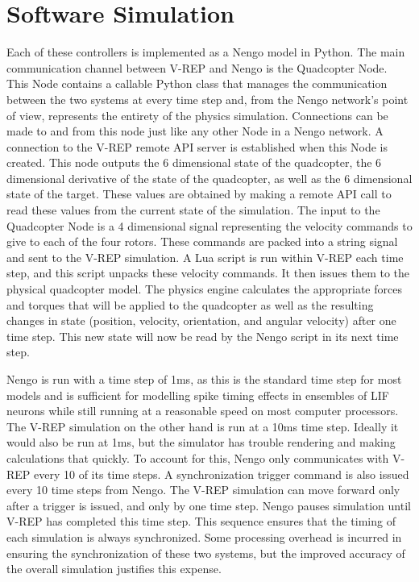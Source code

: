 \documentclass[letterpaper,12pt,titlepage,oneside,final]{book}
\begin{document}
\section{Software Simulation}


Each of these controllers is implemented as a Nengo model in Python. 
The main communication channel between V-REP and Nengo is the Quadcopter Node. 
This Node contains a callable Python class that manages the communication between the two systems at every time step and, from the Nengo network's point of view, represents the entirety of the physics simulation. 
Connections can be made to and from this node just like any other Node in a Nengo network. 
A connection to the V-REP remote API server is established when this Node is created. 
This node outputs the 6 dimensional state of the quadcopter, the 6 dimensional derivative of the state of the quadcopter, as well as the 6 dimensional state of the target. 
These values are obtained by making a remote API call to read these values from the current state of the simulation. The input to the Quadcopter Node is a 4 dimensional signal representing the velocity commands to give to each of the four rotors. 
These commands are packed into a string signal and sent to the V-REP simulation. 
A Lua script is run within V-REP each time step, and this script unpacks these velocity commands. 
It then issues them to the physical quadcopter model. The physics engine calculates the appropriate forces and torques that will be applied to the quadcopter as well as the resulting changes in state (position, velocity, orientation, and angular velocity) after one time step. 
This new state will now be read by the Nengo script in its next time step.

Nengo is run with a time step of 1ms, as this is the standard time step for most models and is sufficient for modelling spike timing effects in ensembles of LIF neurons while still running at a reasonable speed on most computer processors. 
The V-REP simulation on the other hand is run at a 10ms time step. 
Ideally it would also be run at 1ms, but the simulator has trouble rendering and making calculations that quickly. 
To account for this, Nengo only communicates with V-REP every 10 of its time steps. 
A synchronization trigger command is also issued every 10 time steps from Nengo. 
The V-REP simulation can move forward only after a trigger is issued, and only by one time step. 
Nengo pauses simulation until V-REP has completed this time step. 
This sequence ensures that the timing of each simulation is always synchronized. 
Some processing overhead is incurred in ensuring the synchronization of these two systems, but the improved accuracy of the overall simulation justifies this expense. 
\end{document}
